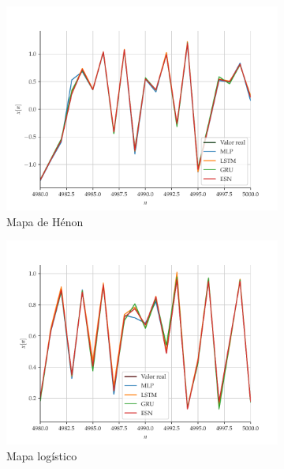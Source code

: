 \documentclass{article}
\begin{document}
\begin{figure}[!ht]
     \begin{subfigure}[t]{0.2\textwidth}
         \includegraphics[scale=0.2]{vs-henon-zoom.pdf}
         \caption{Mapa de Hénon}
     \end{subfigure}
     \centering
     \begin{subfigure}[t]{0.2\textwidth} 
         \includegraphics[scale=0.2]{vs-logistic-zoom.pdf}
         \caption{Mapa logístico}
     \end{subfigure}
     \centering
     \begin{subfigure}[t]{0.2\textwidth}

\end{subfigure}
\end{figure}
\end{document}
